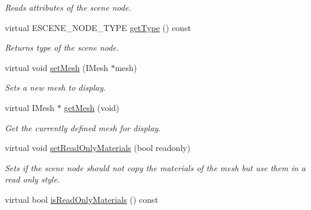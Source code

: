 \begin{DoxyCompactItemize}
\begin{DoxyCompactList}\small\item\em Reads attributes of the scene node. \end{DoxyCompactList}\item 
\hypertarget{classirr_1_1scene_1_1_c_octree_scene_node_addf5a5e7a59be3f20c8252049c7d65d7}{virtual E\-S\-C\-E\-N\-E\-\_\-\-N\-O\-D\-E\-\_\-\-T\-Y\-P\-E \hyperlink{classirr_1_1scene_1_1_c_octree_scene_node_addf5a5e7a59be3f20c8252049c7d65d7}{get\-Type} () const }\label{classirr_1_1scene_1_1_c_octree_scene_node_addf5a5e7a59be3f20c8252049c7d65d7}

\begin{DoxyCompactList}\small\item\em Returns type of the scene node. \end{DoxyCompactList}\item 
\hypertarget{classirr_1_1scene_1_1_c_octree_scene_node_a1716cefb4383bb265882d1316f72d9bd}{virtual void \hyperlink{classirr_1_1scene_1_1_c_octree_scene_node_a1716cefb4383bb265882d1316f72d9bd}{set\-Mesh} (I\-Mesh $\ast$mesh)}\label{classirr_1_1scene_1_1_c_octree_scene_node_a1716cefb4383bb265882d1316f72d9bd}

\begin{DoxyCompactList}\small\item\em Sets a new mesh to display. \end{DoxyCompactList}\item 
\hypertarget{classirr_1_1scene_1_1_c_octree_scene_node_a4b1d0a118f310fa30ab94cacfaa37aad}{virtual I\-Mesh $\ast$ \hyperlink{classirr_1_1scene_1_1_c_octree_scene_node_a4b1d0a118f310fa30ab94cacfaa37aad}{get\-Mesh} (void)}\label{classirr_1_1scene_1_1_c_octree_scene_node_a4b1d0a118f310fa30ab94cacfaa37aad}

\begin{DoxyCompactList}\small\item\em Get the currently defined mesh for display. \end{DoxyCompactList}\item 
\hypertarget{classirr_1_1scene_1_1_c_octree_scene_node_afaeef4d70f90efaf8547fbe03b814d61}{virtual void \hyperlink{classirr_1_1scene_1_1_c_octree_scene_node_afaeef4d70f90efaf8547fbe03b814d61}{set\-Read\-Only\-Materials} (bool readonly)}\label{classirr_1_1scene_1_1_c_octree_scene_node_afaeef4d70f90efaf8547fbe03b814d61}

\begin{DoxyCompactList}\small\item\em Sets if the scene node should not copy the materials of the mesh but use them in a read only style. \end{DoxyCompactList}\item 
\hypertarget{classirr_1_1scene_1_1_c_octree_scene_node_a092e97ddc4b76fd42eb7ffaf0c8de5bc}{virtual bool \hyperlink{classirr_1_1scene_1_1_c_octree_scene_node_a092e97ddc4b76fd42eb7ffaf0c8de5bc}{is\-Read\-Only\-Materials} () const }\label{classirr_1_1scene_1_1_c_octree_scene_node_a092e97ddc4b76fd42eb7ffaf0c8de5bc}


\end{DoxyCompactItemize}
